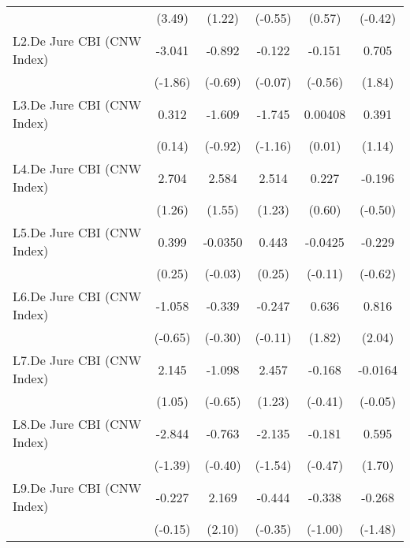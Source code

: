 {\begin{longtable}{l*{5}{c}}
                &   (3.49)         &   (1.22)         &  (-0.55)         &   (0.57)         &  (-0.42)         \\
[1em]
L2.De Jure CBI (CNW Index)&   -3.041         &   -0.892         &   -0.122         &   -0.151         &    0.705         \\
                &  (-1.86)         &  (-0.69)         &  (-0.07)         &  (-0.56)         &   (1.84)         \\
[1em]
L3.De Jure CBI (CNW Index)&    0.312         &   -1.609         &   -1.745         &  0.00408         &    0.391         \\
                &   (0.14)         &  (-0.92)         &  (-1.16)         &   (0.01)         &   (1.14)         \\
[1em]
L4.De Jure CBI (CNW Index)&    2.704         &    2.584         &    2.514         &    0.227         &   -0.196         \\
                &   (1.26)         &   (1.55)         &   (1.23)         &   (0.60)         &  (-0.50)         \\
[1em]
L5.De Jure CBI (CNW Index)&    0.399         &  -0.0350         &    0.443         &  -0.0425         &   -0.229         \\
                &   (0.25)         &  (-0.03)         &   (0.25)         &  (-0.11)         &  (-0.62)         \\
[1em]
L6.De Jure CBI (CNW Index)&   -1.058         &   -0.339         &   -0.247         &    0.636         &    0.816\sym{*}  \\
                &  (-0.65)         &  (-0.30)         &  (-0.11)         &   (1.82)         &   (2.04)         \\
[1em]
L7.De Jure CBI (CNW Index)&    2.145         &   -1.098         &    2.457         &   -0.168         &  -0.0164         \\
                &   (1.05)         &  (-0.65)         &   (1.23)         &  (-0.41)         &  (-0.05)         \\
[1em]
L8.De Jure CBI (CNW Index)&   -2.844         &   -0.763         &   -2.135         &   -0.181         &    0.595         \\
                &  (-1.39)         &  (-0.40)         &  (-1.54)         &  (-0.47)         &   (1.70)         \\
[1em]
L9.De Jure CBI (CNW Index)&   -0.227         &    2.169\sym{*}  &   -0.444         &   -0.338         &   -0.268         \\
                &  (-0.15)         &   (2.10)         &  (-0.35)         &  (-1.00)         &  (-1.48)         \\

\end{longtable}}
